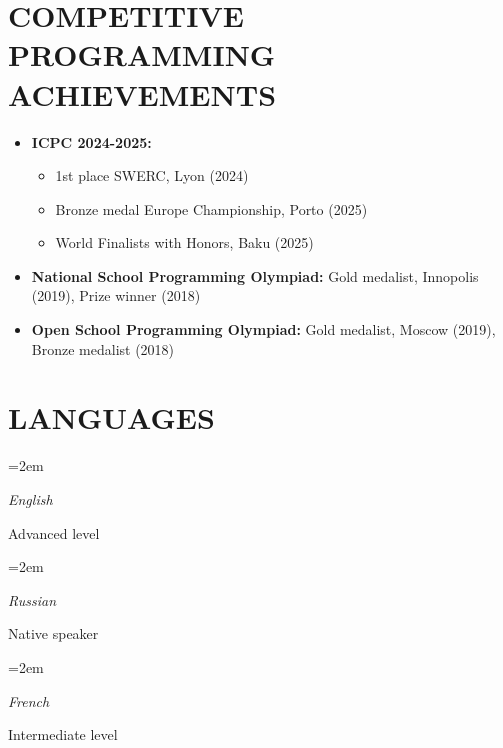 \documentclass[paper=a4,fontsize=11pt]{scrartcl} %
\newcommand*\Hs{\ensuremath{\color{red}\varheartsuit}}
\newcommand{\heartstab}{%
}
\newlength{\spacebox}
\newcommand{\sepspace}{\vspace*{0em}}		%
\newcommand{\NewPart}[1]{\section*{\uppercase{#1}}}
\newcommand{\SkillsEntry}[2]{      %
		\noindent\hangindent=2em\hangafter=0 %
		\parbox{\spacebox}{        %
		\textit{#1}}			   %
		\hspace{1.5em} #2 \par}    %
\begin{document}
\begin{itemize}
\end{itemize}

\sepspace

\NewPart{Competitive Programming Achievements}{}

\begin{itemize}
    \item[\heartstab] \textbf{ICPC 2024-2025:}
    \begin{itemize}
        \item 1st place SWERC, Lyon (2024)
        \item Bronze medal Europe Championship, Porto (2025)
        \item World Finalists with Honors, Baku (2025)
    \end{itemize}
    \item[\heartstab] \textbf{National School Programming Olympiad:} Gold medalist, Innopolis (2019), Prize winner (2018)
    \item[\heartstab] \textbf{Open School Programming Olympiad:} Gold medalist, Moscow (2019), Bronze medalist (2018)
\end{itemize}

\sepspace
\NewPart{Languages}{}

\SkillsEntry{English}{Advanced level}
\SkillsEntry{Russian}{Native speaker}
\SkillsEntry{French}{Intermediate level}

\end{document}
